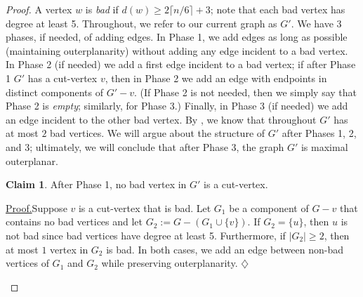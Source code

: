 \documentclass[11pt]{article}
\theoremstyle{definition}
\newtheorem{clmA}{Claim}
\renewcommand\ge\geqslant
\newenvironment{clmproof}[1]{\par\noindent\underline{Proof.}\space#1}{\leavevmode\unskip\penalty9999\hbox{}\nobreak\hfill\quad\hbox{$\diamondsuit$}\smallskip}
\begin{document}
\begin{proof}
	A vertex $w$ is \emph{bad} if $d(w)\ge 2\lceil n/6\rceil+3$; note that each bad vertex has degree at least 5.  Throughout, we refer to our current
	graph as $G'$.  We have $3$ phases, if needed, of adding edges.  In Phase 1, we add edges as long as possible (maintaining outerplanarity) 
	without adding any edge incident to a bad vertex.  In Phase 2 (if needed) we add a first edge incident to a bad vertex; if after Phase 1 
	$G'$ has a cut-vertex $v$, then in Phase 2 we add an edge with endpoints in distinct components of $G'-v$.  (If Phase 2 is not needed, then we
	simply say that Phase 2 is \emph{empty}; similarly, for Phase 3.) Finally, in Phase 3 (if needed) we add an edge incident to the other bad vertex.  
	By , we know that throughout $G'$ has at most $2$ bad vertices.  We will argue about the structure of $G'$ after 
	Phases 1, 2, and 3;  ultimately, we will conclude that after Phase 3, the graph $G'$ is maximal outerplanar.

    \begin{clmA}
    \label{subclaim2}
    	After Phase 1, no bad vertex in $G'$ is a cut-vertex.
    \end{clmA}
    \begin{clmproof}
   	Suppose $v$ is a cut-vertex that is bad. Let $G_1$ be a component of $G-v$ that contains no bad vertices and let $G_2:=G-(G_1\cup\{v\})$. 
	If $G_2=\{u\}$, then $u$ is not bad since bad vertices have degree at least 5. Furthermore, if $|G_2|\ge2$, then at most $1$ vertex in $G_2$ is bad. 
	In both cases, we add an edge between non-bad vertices of $G_1$ and $G_2$ while preserving outerplanarity.  
    \end{clmproof}

    
    \begin{figure}[h]
    \centering
\end{figure}
\end{proof}
\end{document}
